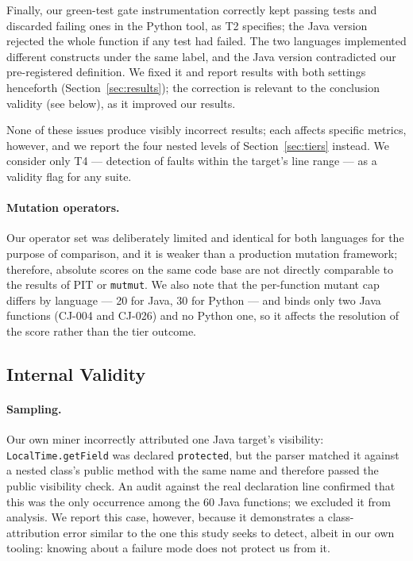 Finally, our green-test gate instrumentation correctly kept passing tests and discarded failing
ones in the Python tool, as T2 specifies; the Java version rejected the whole function if any
test had failed. The two languages implemented different constructs under the same label, and
the Java version contradicted our pre-registered definition. We fixed it and report results with
both settings henceforth (Section~\ref{sec:results}); the correction is relevant to the
conclusion validity (see below), as it improved our results.

None of these issues produce visibly incorrect results; each affects specific metrics, however,
and we report the four nested levels of Section~\ref{sec:tiers} instead. We consider only T4 ---
detection of faults within the target's line range --- as a validity flag for any suite.

\paragraph{Mutation operators.}
Our operator set was deliberately limited and identical for both languages for the purpose of
comparison, and it is weaker than a production mutation framework; therefore, absolute scores on
the same code base are not directly comparable to the results of PIT or \texttt{mutmut}. We also
note that the per-function mutant cap differs by language --- 20 for Java, 30 for Python --- and
binds only two Java functions (CJ-004 and CJ-026) and no Python one, so it affects the
resolution of the score rather than the tier outcome.

\subsection{Internal Validity}

\paragraph{Sampling.}
Our own miner incorrectly attributed one Java target's visibility: \texttt{LocalTime.getField}
was declared \texttt{protected}, but the parser matched it against a nested class's public method
with the same name and therefore passed the public visibility check. An audit against the real
declaration line confirmed that this was the only occurrence among the 60 Java functions; we
excluded it from analysis. We report this case, however, because it demonstrates a
class-attribution error similar to the one this study seeks to detect, albeit in our own
tooling: knowing about a failure mode does not protect us from it.

